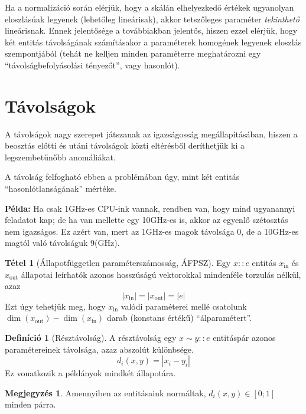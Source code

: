 \documentclass[twocolumn]{article}
\theoremstyle{definition}
\newtheorem{definition}{Definíció}[section]
\newtheorem{theorem}{Tétel}[section]
\newtheorem*{megj}{Megjegyzés}
\newcommand{\subin}[1]{ {#1}_{\text{in}} }
\newcommand{\subout}[1]{ {#1}_{\text{out}} }
\newcommand{\pl}{ \textbf{Példa:} }
\begin{document}
    Ha a normalizáció során elérjük, hogy a skálán elhelyezkedő értékek ugyanolyan eloszlásúak legyenek (lehetőleg lineárisak), akkor tetszőleges paraméter {\it tekinthető} lineárisnak. Ennek jelentősége a továbbiakban jelentős, hiszen ezzel elérjük, hogy két entitás távolságának számításakor a paraméterek homogének legyenek eloszlás szempontjából (tehát ne kelljen minden paraméterre meghatározni egy \enquote{távolságbefolyásolási tényezőt}, vagy hasonlót).
    
\section{Távolságok}    
    
    A távolságok nagy szerepet játszanak az igazságosság megállapításában, hiszen a beosztás előtti és utáni távolságok közti eltérésből deríthetjük ki a legszembetűnőbb anomáliákat.
    
    A távolság felfogható ebben a problémában úgy, mint két entitás \enquote{hasonlótlanságának} mértéke.
    
    \pl Ha csak 1GHz-es CPU-ink vannak, rendben van, hogy mind ugyanannyi feladatot kap; de ha van mellette egy 10GHz-es is, akkor az egyenlő szétosztás nem igazságos. Ez azért van, mert az 1GHz-es magok távolsága 0, de a 10GHz-es magtól való távolságuk 9(GHz).
    
    \begin{theorem}[Állapotfüggetlen paraméterszámosság, ÁFPSZ]
        Egy $x::e$ entitás $\subin x$ és $\subout x$ állapotai leírhatók azonos hosszúságú vektorokkal mindenféle torzulás nélkül, azaz
        \begin{equation}
            |\subin x| = |\subout x| = |e|
        \end{equation}
        Ezt úgy tehetjük meg, hogy $\subin x$ valódi paraméterei mellé csatolunk $ \dim(\subout x) - \dim(\subin x) $ darab (konstans értékű) \enquote{álparamétert}. 
    \end{theorem}
    
    \begin{definition}[Résztávolság]\label{def:partial_distance}
        A résztávolság egy $x \sim y :: e$ entitáspár azonos paramétereinek távolsága, azaz abszolút különbsége.
        \begin{equation}
            d_i(x, y) = |x_i - y_i|
        \end{equation}
        Ez vonatkozik a példányok mindkét állapotára.
        \begin{megj}
            Amennyiben az entitásaink normáltak, $d_i(x, y) \in [0;1]$ minden párra.
        \end{megj}
    \end{definition}
    
\end{document}
